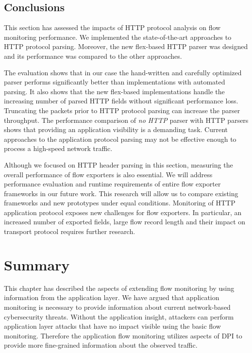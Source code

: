 \subsection{Conclusions} \label{subsec:http-conclusion}

This section has assessed the impacts of HTTP protocol analysis on flow monitoring performance. We implemented the state-of-the-art approaches to HTTP protocol parsing. Moreover, the new flex-based HTTP parser was designed and its performance was compared to the other approaches.

The evaluation shows that in our case the hand-written and carefully optimized parser performs significantly better than implementations with automated parsing. It also shows that the new flex-based implementations handle the increasing number of parsed HTTP fields without significant performance loss. Truncating the packets prior to HTTP protocol parsing can increase the parser throughput. The performance comparison of \emph{no HTTP} parser with HTTP parsers shows that providing an application visibility is a demanding task. Current approaches to the application protocol parsing may not be effective enough to process a high-speed network traffic.

Although we focused on HTTP header parsing in this section, measuring the overall performance of flow exporters is also essential. We will address performance evaluation and runtime requirements of entire flow exporter frameworks in our future work. This research will allow us to compare existing frameworks and new prototypes under equal conditions. Monitoring of HTTP application protocol exposes new challenges for flow exporters. In particular, an increased number of exported fields, large flow record length and their impact on transport protocol requires further research.


\section{Summary}\label{sec:app-summary}

This chapter has described the aspects of extending flow monitoring by using information from the application layer. We have argued that application monitoring is necessary to provide information about current network-based cybersecurity threats. Without the application insight, attackers can perform application layer attacks that have no impact visible using the basic flow monitoring. Therefore the application flow monitoring utilizes aspects of DPI to provide more fine-grained information about the observed traffic. 

